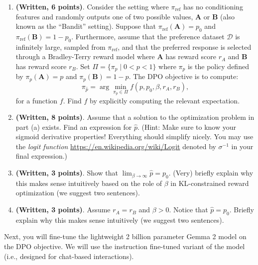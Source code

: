 \documentclass[
  letterpaper,
  DIV=11,
  numbers=noendperiod,
  oneside]{scrreprt}
\theoremstyle{remark}
\begin{document}
\begin{enumerate}
\def\labelenumi{(\alph{enumi})}
\item
  \textbf{(Written, 6 points)}. Consider the setting where
  \(\pi_{\text{ref}}\) has no conditioning features and randomly outputs
  one of two possible values, \(\mathbf{A}\) or \(\mathbf{B}\) (also
  known as the ``Bandit'' setting). Suppose that
  \(\pi_{\text{ref}}(\mathbf{A})=p_0\) and
  \(\pi_{\text{ref}}(\mathbf{B})=1-p_0\). Furthermore, assume that the
  preference dataset \(\mathcal{D}\) is infinitely large, sampled from
  \(\pi_{\text{ref}}\), and that the preferred response is selected
  through a Bradley-Terry reward model where \(\mathbf{A}\) has reward
  score \(r_A\) and \(\mathbf{B}\) has reward score \(r_B\). Set
  \(\Pi=\{\pi_p\mid 0<p<1\}\) where \(\pi_p\) is the policy defined by
  \(\pi_p(\mathbf{A})=p\) and \(\pi_p(\mathbf{B})=1-p\). The DPO
  objective is to compute:
  \[\pi_{\hat{p}}=\arg \min_{\pi_p\in \Pi} f(p, p_0, \beta, r_A, r_B),\]
  for a function \(f\). Find \(f\) by explicitly computing the relevant
  expectation.
\item
  \textbf{(Written, 8 points)}. Assume that a solution to the
  optimization problem in part (a) exists. Find an expression for
  \(\hat{p}\). (Hint: Make sure to know your sigmoid derivative
  properties! Everything should simplify nicely. You may use the
  \emph{logit function} \url{https://en.wikipedia.org/wiki/Logit}
  denoted by \(\sigma^{-1}\) in your final expression.)
\item
  \textbf{(Written, 3 points)}. Show that
  \(\lim_{\beta\to\infty}\hat{p}=p_0.\) (Very) briefly explain why this
  makes sense intuitively based on the role of \(\beta\) in
  KL-constrained reward optimization (we suggest two sentences).
\item
  \textbf{(Written, 3 points)}. Assume \(r_A=r_B\) and \(\beta>0\).
  Notice that \(\hat{p}=p_0\). Briefly explain why this makes sense
  intuitively (we suggest two sentences).
\end{enumerate}

Next, you will fine-tune the lightweight 2 billion parameter Gemma 2
model on the DPO objective. We will use the instruction fine-tuned
variant of the model (i.e., designed for chat-based interactions).
\end{document}
